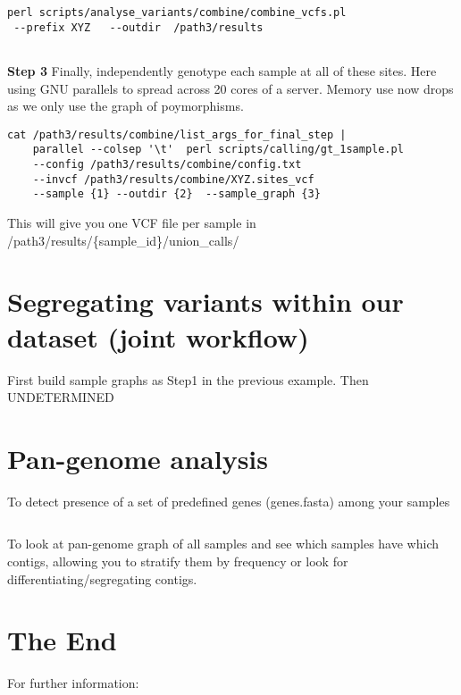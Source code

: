 \documentclass[a4paper,9pt]{extarticle}
\begin{document}
\begin{multicols*}{2}
\begin{verbatim}
perl scripts/analyse_variants/combine/combine_vcfs.pl 
 --prefix XYZ   --outdir  /path3/results
   
\end{verbatim}
{\bf Step 3} Finally, independently genotype each sample at all of these sites. Here using GNU parallels to spread across 20 cores of a server. Memory use now drops as we only use the graph of poymorphisms.
\begin{verbatim}
cat /path3/results/combine/list_args_for_final_step | 
    parallel --colsep '\t'  perl scripts/calling/gt_1sample.pl
    --config /path3/results/combine/config.txt
    --invcf /path3/results/combine/XYZ.sites_vcf
    --sample {1} --outdir {2}  --sample_graph {3} 
\end{verbatim}
This will give you one VCF file per sample in \\
/path3/results/\{sample\_id\}/union\_calls/

\section{Segregating variants within our dataset (joint workflow)}
First build sample graphs as Step1 in the previous example. Then UNDETERMINED



\section{Pan-genome analysis}

To detect presence of a set of predefined genes (genes.fasta) among your samples
\begin{verbatim}
\end{verbatim}
To look at pan-genome graph of all samples and see which samples have which contigs, allowing you to stratify them by frequency or look for differentiating/segregating contigs.


\section{The End}

For further information:


\end{multicols*}
\end{document}
